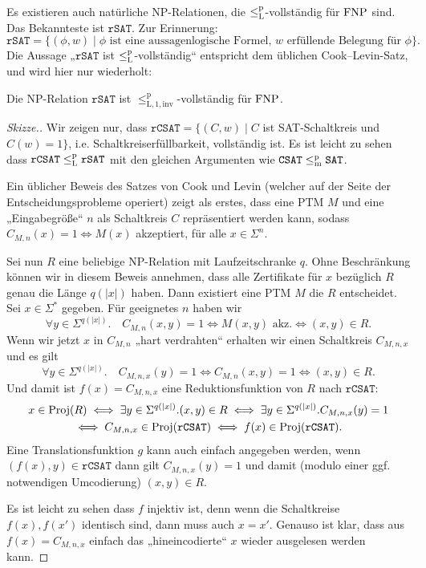Es existieren auch natürliche NP-Relationen, die $\leq_\mathrm{L}^\mathrm{p}$-vollständig für $\mathrm{FNP}$ sind.
Das Bekannteste ist $\mathtt{rSAT}$. Zur Erinnerung:
\[ \mathtt{rSAT} = \{ (\phi, w) \mid \text{$\phi$ ist eine aussagenlogische Formel, $w$ erfüllende Belegung für $\phi$} \}. \]
Die Aussage „$\mathtt{rSAT}$ ist $\leq_\mathrm{L}^\mathrm{p}$-vollständig“ entspricht dem üblichen Cook--Levin-Satz, und wird hier nur wiederholt:
\begin{theorem}
    Die NP-Relation $\mathtt{rSAT}$ ist $\leq_\mathrm{L,1,inv}^\mathrm p$-vollständig für $\mathrm{FNP}$.
\end{theorem}
\begin{proof}[Skizze.]
    Wir zeigen nur, dass $\mathtt{rCSAT}=\{(C, w) \mid C$ ist SAT-Schaltkreis und $C(w)=1\}$, i.e. Schaltkreiserfüllbarkeit, vollständig ist. Es ist leicht zu sehen dass $\mathtt{rCSAT}\leq_\mathrm{L}^\mathrm{p} \mathtt{rSAT}$ mit den gleichen Argumenten wie $\mathtt{CSAT}\leq_\mathrm{m}^\mathrm{p} \mathtt{SAT}$.

    Ein üblicher Beweis des Satzes von Cook und Levin (welcher auf der Seite der Entscheidungsprobleme operiert) zeigt als erstes, dass eine PTM $M$ und eine „Eingabegröße“ $n$ als Schaltkreis $C$ repräsentiert werden kann, sodass $C_{M,n}(x)=1 \iff M(x)$ akzeptiert, für alle $x\in\Sigma^{n}$.

    Sei nun $R$ eine beliebige NP-Relation mit Laufzeitschranke $q$. Ohne Beschränkung können wir in diesem Beweis annehmen, dass alle Zertifikate für $x$ bezüglich $R$ genau die Länge $q(|x|)$ haben. Dann existiert eine PTM $M$ die $R$ entscheidet. Sei $x\in\Sigma^*$ gegeben. Für geeignetes $n$ haben wir
    \[ \forall y\in\Sigma^{q(|x|)}.\quad C_{M,n}(x,y)=1 \iff M(x,y)\text{ akz.} \iff (x,y)\in R. \]
    Wenn wir jetzt $x$ in $C_{M,n}$ „hart verdrahten“ erhalten wir einen Schaltkreis $C_{M,n,x}$ und es gilt
    \[ \forall y\in\Sigma^{q(|x|)}.\quad C_{M,n,x}(y)=1 \iff C_{M,n}(x,y)=1 \iff (x,y)\in R. \]
    Und damit ist $f(x) = C_{M,n,x}$ eine Reduktionsfunktion von $R$ nach $\mathtt{rCSAT}$:
    \begin{gather*}
    x\in \operatorname{Proj}(R) \iff \exists  y\in\Sigma^{q(|x|)}.(x,y)\in R \iff \exists y\in\Sigma^{q(|x|)}.C_{M,n,x}(y)=1 \\\iff C_{M,n,x}\in\operatorname{Proj}(\mathtt{rCSAT}) \iff f(x)\in\operatorname{Proj}(\mathtt{rCSAT}). \end{gather*}
    Eine Translationsfunktion $g$ kann auch einfach angegeben werden, wenn $(f(x), y)\in \mathtt{rCSAT}$ dann gilt $C_{M,n,x}(y)=1$ und damit (modulo einer ggf. notwendigen Umcodierung) $(x,y)\in R$.

    Es ist leicht zu sehen dass $f$ injektiv ist, denn wenn die Schaltkreise $f(x), f(x')$ identisch sind, dann muss auch $x=x'$. Genauso ist klar, dass aus $f(x)=C_{M,n,x}$ einfach das „hineincodierte“ $x$ wieder ausgelesen werden kann.
\end{proof}

